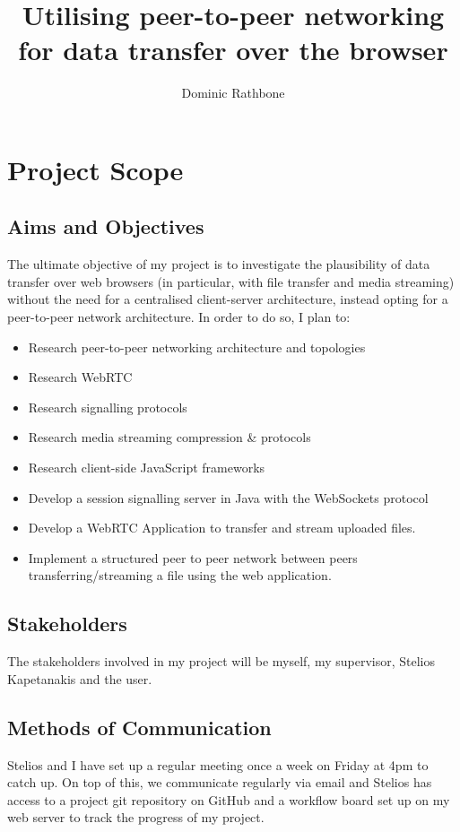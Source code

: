 \documentclass[]{report}
\title{Utilising peer-to-peer networking for data transfer over the browser}
\author{Dominic Rathbone}
\begin{document}
\maketitle
\tableofcontents

\chapter{Project Scope}
\section{Aims and Objectives}
	The ultimate objective of my project is to investigate the plausibility of data transfer over web browsers (in particular, with file transfer and media streaming) without the need for a centralised client-server architecture, instead opting for a peer-to-peer network architecture. In order to do so, I plan to:
	\begin{itemize}
		\item Research peer-to-peer networking architecture and topologies
		\item Research WebRTC
		\item Research signalling protocols
		\item Research media streaming compression \& protocols
		\item Research client-side JavaScript frameworks
		\item Develop a session signalling server in Java with the WebSockets protocol
		\item Develop a WebRTC Application to transfer and stream uploaded files.
		\item Implement a structured peer to peer network between peers transferring/streaming a file using the web application.
	\end{itemize}
\section{Stakeholders}
	The stakeholders involved in my project will be myself, my supervisor, Stelios Kapetanakis and the user.
\section{Methods of Communication}
	Stelios and I have set up a regular meeting once a week on Friday at 4pm to catch up. On top of this, we communicate regularly via email and Stelios has access to a project git repository on GitHub and a workflow board set up on my web server to track the progress of my project. 
	
\end{document}
